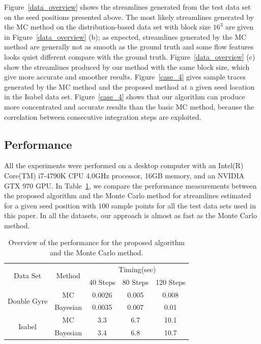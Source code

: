 Figure~\ref{data_overview} shows the streamlines generated from the test data set on the seed positions presented above. The most likely streamlines generated by the MC method on the distribution-based data set with block size $16^3$ are given in Figure~\ref{data_overview} (b); as expected, streamlines generated by the MC method are generally not as smooth as the ground truth and some flow features looks quiet different compare with the ground truth. Figure~\ref{data_overview} (c) show the streamlines produced by our method with the same block size, which give more accurate and smoother results. Figure~\ref{case_4} gives sample traces generated by the MC method and the proposed method at a given seed location in the Isabel data set. Figure~\ref{case_4} shows that our algorithm can produce more concentrated and accurate results than the basic MC method, because the correlation between consecutive integration steps are exploited.

\subsection{Performance}

All the experiments were performed on a desktop computer with an Intel(R) Core(TM) i7-4790K CPU 4.0GHz processor, 16GB memory, and an NVIDIA GTX 970 GPU. In Table~\ref{timing}, we compare the performance measurements between the proposed algorithm and the Monte Carlo method for streamlines estimated for a given seed position with $100$ sample points for all the test data sets used in this paper. In all the datasets, our approach is almost as fast as the Monte Carlo method.

\begin{table}[!htb]
\centering
\begin{tabular}{|c|c|c|c|c|}
\hline
\multirow{2}{*}{Data Set}    & \multirow{2}{*}{Method}     & \multicolumn{3}{c|}{Timing(sec)}  \\ \cline{3-5}
                             &                             & 40 Steps  & 80 Steps & 120 Steps  \\ \hline
\multirow{2}{*}{Double Gyre} & MC                          & 0.0026    & 0.005    & 0.008      \\ \cline{2-5}
                             & Bayesian             & 0.0035    & 0.007    & 0.01       \\ \hline
\multirow{2}{*}{Isabel}      & MC                          & 3.3       & 6.7      & 10.1       \\ \cline{2-5}
                             & Bayesian             & 3.4       & 6.8      & 10.7       \\ \hline

\end{tabular}
\caption{Overview of the performance for the proposed algorithm and the Monte Carlo method.}
\label{timing}
\end{table}
